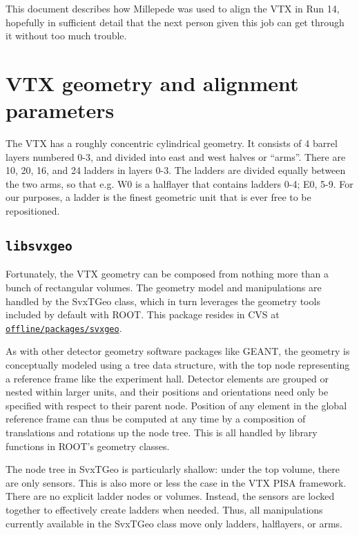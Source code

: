 \documentclass[12pt]{article}
\begin{document}
This document describes how Millepede was used to align the VTX in Run 14, hopefully in sufficient detail that the next person given this job can get through it without too much trouble.

\section{VTX geometry and alignment parameters}
The VTX has a roughly concentric cylindrical geometry. It consists of 4 barrel layers numbered 0-3, and divided into east and west halves or ``arms''. There are 10, 20, 16, and 24 ladders in layers 0-3. The ladders are divided equally between the two arms, so that e.g. W0 is a halflayer that contains ladders 0-4; E0, 5-9. For our purposes, a ladder is the finest geometric unit that is ever free to be repositioned.

\subsection{\texttt{libsvxgeo}} \label{sec:svxgeo}
Fortunately, the VTX geometry can be composed from nothing more than a bunch of rectangular volumes. The geometry model and manipulations are handled by the SvxTGeo class, which in turn leverages the geometry tools included by default with ROOT. This package resides in CVS at \href{https://www.phenix.bnl.gov/viewvc/viewvc.cgi/phenix/offline/packages/svxgeo}{\texttt{offline/\-packages/\-svxgeo}}.

\medskip
As with other detector geometry software packages like GEANT, the geometry is conceptually modeled using a tree data structure, with the top node representing a reference frame like the experiment hall. Detector elements are grouped or nested within larger units, and their positions and orientations need only be specified with respect to their parent node. Position of any element in the global reference frame can thus be computed at any time by a composition of translations and rotations up the node tree. This is all handled by library functions in ROOT's geometry classes.

The node tree in SvxTGeo is particularly shallow: under the top volume, there are only sensors. This is also more or less the case in the VTX PISA framework.
There are no explicit ladder nodes or volumes. Instead, the sensors are locked together to effectively create ladders when needed. Thus, all manipulations currently available in the SvxTGeo class move only ladders, halflayers, or arms.
\end{document}
